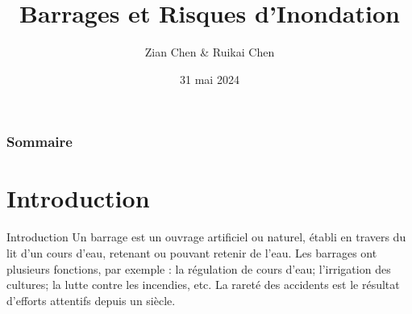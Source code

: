 \documentclass{beamer}
\title{Barrages et Risques d'Inondation}
\author{Zian Chen \& Ruikai Chen}
\date{31 mai 2024}
\begin{document}
\frame{\titlepage}
\begin{frame}
\frametitle{Sommaire}
\tableofcontents
\end{frame} %
\section{Introduction}
\begin{frame}{Introduction}
    Un barrage est un ouvrage artificiel ou naturel, établi en travers du lit
d'un cours d'eau, retenant ou pouvant retenir de l'eau. Les barrages ont plusieurs fonctions, par exemple : la régulation de cours d'eau; l'irrigation des cultures; la lutte contre les incendies, etc. La rareté des accidents est le résultat d'efforts attentifs depuis un siècle.
\end{frame}
\end{document}
